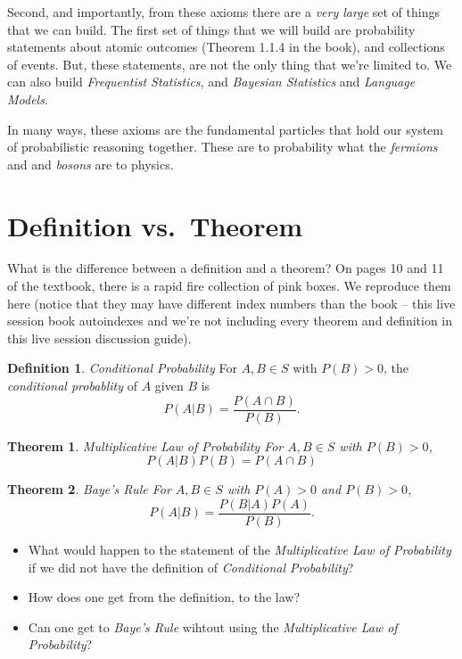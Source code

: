 \documentclass[
]{book}
\providecommand{\tightlist}{%
  \setlength{\itemsep}{0pt}\setlength{\parskip}{0pt}}
\newtheorem{theorem}{Theorem}[chapter]
\theoremstyle{definition}
\newtheorem{definition}{Definition}[chapter]
\theoremstyle{definition}
\theoremstyle{definition}
\theoremstyle{definition}
\theoremstyle{remark}
\begin{document}
Second, and importantly, from these axioms there are a \emph{very large} set of things that we can build. The first set of things that we will build are probability statements about atomic outcomes (Theorem 1.1.4 in the book), and collections of events. But, these statements, are not the only thing that we're limited to. We can also build \emph{Frequentist Statistics}, and \emph{Bayesian Statistics} and \emph{Language Models}.

In many ways, these axioms are the fundamental particles that hold our system of probabilistic reasoning together. These are to probability what the \emph{fermions} and and \emph{bosons} are to physics.

\hypertarget{definition-vs.-theorem}{%
\section{Definition vs.~Theorem}\label{definition-vs.-theorem}}

What is the difference between a definition and a theorem? On pages 10 and 11 of the textbook, there is a rapid fire collection of pink boxes. We reproduce them here (notice that they may have different index numbers than the book -- this live session book autoindexes and we're not including every theorem and definition in this live session discussion guide).

\begin{definition}
\emph{Conditional Probability} For \(A, B \in S\) with \(P(B) > 0\), the \emph{conditional probablity} of \(A\) given \(B\) is \[P(A|B) = \frac{P(A\cap B)}{P(B)}.\]
\end{definition}

\begin{theorem}
\emph{Multiplicative Law of Probability} For \(A, B \in S\) with \(P(B) > 0\), \[P(A|B)P(B) = P(A \cap B)\]
\end{theorem}

\begin{theorem}
\emph{Baye's Rule} For \(A, B \in S\) with \(P(A) > 0\) and \(P(B) > 0\), \[P(A|B) = \frac{P(B|A)P(A)}{P(B)}.\]
\end{theorem}

\begin{itemize}
\tightlist
\item
  What would happen to the statement of the \emph{Multiplicative Law of Probability} if we did not have the definition of \emph{Conditional Probability}?
\item
  How does one get from the definition, to the law?
\item
  Can one get to \emph{Baye's Rule} wihtout using the \emph{Multiplicative Law of Probability}?
\end{itemize}
\end{document}
